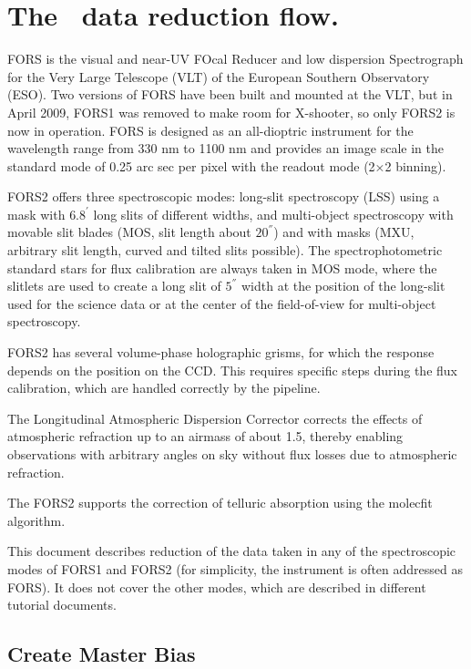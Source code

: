 \section{The \instname\ data reduction flow.}
\label{sec:reduction_flow}

FORS is the visual and near-UV FOcal Reducer and low dispersion Spectrograph for the Very Large Telescope (VLT) of the European Southern Observatory (ESO). Two versions of FORS have been built and mounted at the VLT, but in April 2009, FORS1 was removed to make room for X-shooter, so only FORS2 is now in operation.
FORS is designed as an all-dioptric instrument for the wavelength range from 330 nm to 1100 nm and provides an image scale in the standard mode of 0.25 arc sec per pixel with the readout mode (2×2 binning).

FORS2 offers three spectroscopic modes: long-slit spectroscopy (LSS) using a mask with $6.8^{'}$ long slits of
different widths, and multi-object spectroscopy with movable slit blades (MOS, slit length about $20^{''}$) and with masks (MXU, arbitrary slit length, curved and tilted slits possible). The spectrophotometric standard stars for flux calibration are always taken in MOS mode, where the slitlets are used to create a long slit of $5^{''}$ width at the position of the long-slit used for the science data or at the center of the field-of-view for multi-object
spectroscopy. 

FORS2 has several volume-phase holographic grisms, for which the response depends on the position on the CCD. This requires specific steps during the flux calibration, which are handled correctly by the pipeline.

The Longitudinal Atmospheric Dispersion Corrector corrects the effects of atmospheric refraction up to an airmass of about 1.5, thereby enabling observations with arbitrary angles on sky without flux losses due to
atmospheric refraction.

The FORS2 supports the correction of telluric absorption using the molecfit algorithm.

This document describes reduction of the data taken in any of the spectroscopic modes of FORS1 and FORS2 (for simplicity, the instrument is often addressed as FORS). It does not cover the other modes, which are described in different tutorial documents.



\subsection{Create Master Bias}

